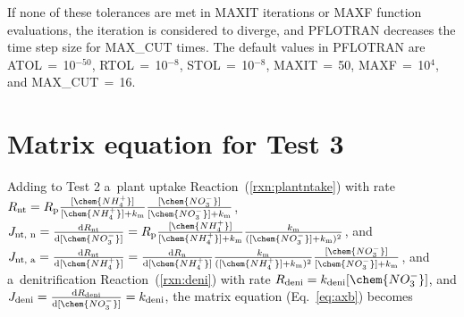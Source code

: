 \documentclass[gmdd, online, hvmath]{copernicus}
\begin{document}
      If none of these tolerances are met in MAXIT iterations or MAXF
      function evaluations, the iteration is considered to diverge, and
      PFLOTRAN decreases the time step size for MAX\_CUT times. The default
      values in PFLOTRAN are ATOL\,$=$\,10$^{-50}$, RTOL\,$=$\,10$^{-8}$,
      STOL\,$=$\,10$^{-8}$, MAXIT\,$=$\,50, MAXF\,$=$\,10$^4$, and
      MAX\_CUT\,$=$\,16.



\section{Matrix equation for Test 3}%
\label{sec:eqtest3}

      Adding to Test 2 a~plant  uptake Reaction~(\ref{rxn:plantntake}) with rate
$R_{\text{nt}}=R_\mathrm{p}\frac{[\chem{NH_4^+}]}{[\chem{NH_4^+}] +
k_\mathrm{m}}\frac{[\chem{NO_3^-}]}{[\chem{NO_3^-}] + k_\mathrm{m}}$,
$J_{\text{nt, n}}=\frac{\mathrm{d} R_{\text{nt}}}{\mathrm{d} [\chem{NO_3^-}]} = R_\mathrm{p}\frac{[\chem{NH_4^+}]}{[\chem{NH_4^+}] + k_\mathrm{m}}\frac{k_\mathrm{m}}{([\chem{NO_3^-}] + k_\mathrm{m})^2}$, and
$J_{\text{nt, a}} = \frac{\mathrm{d} R_{\text{nt}}}{\mathrm{d} [\chem{NH_4^+}]} =
\frac{\mathrm{d} R_\mathrm{n}}{\mathrm{d} [\chem{NH_4^+}]} \frac{k_\mathrm{m}}{([\chem{NH_4^+}] + k_\mathrm{m})^2}\frac{[\chem{NO_3^-}]}{[\chem{NO_3^-}] + k_\mathrm{m}}$,
and a~denitrification Reaction~(\ref{rxn:deni}) with rate $R_{\text{deni}}=k_{\text{deni}} [\chem{NO_3^-}]$,
and $J_{\text{deni}} = \frac{\mathrm{d} R_{\text{deni}}}{\mathrm{d} [\chem{NO_3^-}]}=k_{\text{deni}}$,
the matrix equation (Eq.~\ref{eq:axb}) becomes
\end{document}
